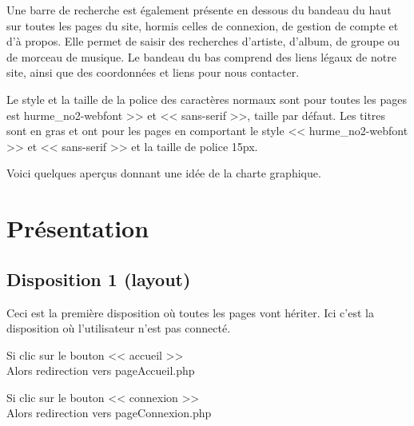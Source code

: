 	\begin{paragraphe}
		Une barre de recherche est également présente en dessous du bandeau du haut sur toutes les pages du site, hormis celles de connexion, de gestion de compte et d'à propos.
		 Elle permet de saisir des recherches d'artiste, d'album, de groupe ou de morceau de musique.
		  Le bandeau du bas comprend des liens légaux de notre site, ainsi que des coordonnées et liens pour nous contacter.
	\end{paragraphe}

	\begin{paragraphe}
		Le style et la taille de la police des caractères normaux sont pour toutes les pages est \og hurme\_no2-webfont >> et << sans-serif >>,
		 taille par défaut. Les titres sont en gras et ont pour les pages en comportant le style << hurme\_no2-webfont >> et << sans-serif >> et la taille de police 15px.
	\end{paragraphe}

	\begin{paragraphe}
		Voici quelques aperçus donnant une idée de la charte graphique.
	\end{paragraphe}

\newpage

\section{Présentation}
	\subsection{Disposition 1 (layout)}
	
		\begin{paragraphe}
			Ceci est la première disposition où toutes les pages vont hériter. Ici c'est la disposition où l'utilisateur n'est pas connecté.
		\end{paragraphe}

		\begin{paragraphe}
			Si clic sur le bouton << accueil >> \\
			Alors redirection vers pageAccueil.php
		\end{paragraphe}

		\begin{paragraphe}
			Si clic sur le bouton << connexion >> \\
			Alors redirection vers pageConnexion.php
		\end{paragraphe}
		
